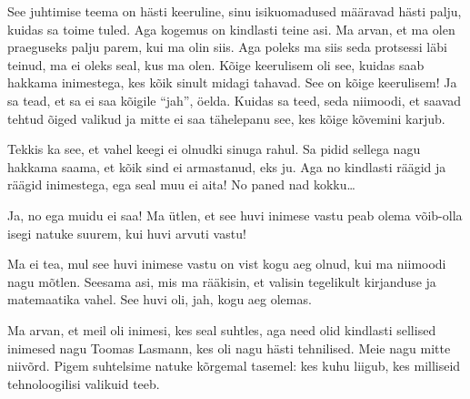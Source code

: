 See juhtimise teema on hästi keeruline, sinu isikuomadused määravad hästi palju, kuidas sa toime tuled. Aga kogemus on kindlasti teine asi. Ma arvan, et ma olen praeguseks palju parem, kui ma olin siis. Aga poleks ma siis seda protsessi läbi teinud,  ma ei oleks seal, kus ma olen. Kõige keerulisem oli see, kuidas saab hakkama inimestega, kes kõik sinult midagi tahavad. See  on kõige keerulisem! Ja sa tead, et sa ei saa kõigile \enquote{jah}, öelda. Kuidas sa teed, seda niimoodi, et saavad tehtud õiged valikud ja mitte ei saa tähelepanu see, kes kõige kõvemini karjub. 


Tekkis ka see, et vahel keegi ei olnudki sinuga rahul. Sa pidid sellega nagu hakkama saama, et kõik sind ei armastanud, eks ju. Aga no kindlasti räägid ja räägid inimestega, ega seal muu ei aita! No paned nad kokku\ldots


Ja, no ega muidu ei saa! Ma ütlen, et see huvi inimese vastu peab olema võib-olla isegi natuke suurem, kui huvi arvuti vastu! 


Ma ei tea, mul see huvi inimese vastu on vist kogu aeg olnud, kui ma niimoodi nagu mõtlen. Seesama asi, mis ma rääkisin, et valisin tegelikult kirjanduse ja matemaatika vahel. See huvi oli, jah, kogu aeg olemas. 


Ma arvan, et meil oli inimesi, kes  seal suhtles, aga need olid kindlasti sellised inimesed nagu Toomas Lasmann, kes oli nagu hästi tehnilised. Meie nagu mitte niivõrd. Pigem suhtelsime natuke kõrgemal tasemel: kes kuhu liigub, kes milliseid tehnoloogilisi valikuid teeb.



